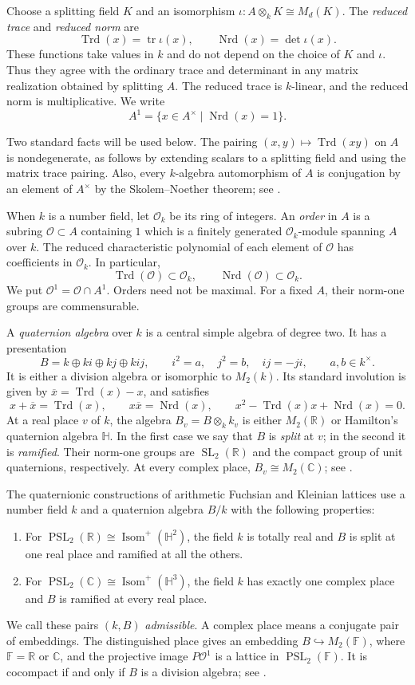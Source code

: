 \documentclass[reqno]{amsart}
\theoremstyle{remark}
\DeclareMathOperator{\tr}{tr}
\DeclareMathOperator{\Trd}{Trd}
\DeclareMathOperator{\Nrd}{Nrd}
\DeclareMathOperator{\SL}{SL}
\DeclareMathOperator{\PSL}{PSL}
\DeclareMathOperator{\Isom}{Isom}
\newcommand{\R}{\mathbb R}
\newcommand{\C}{\mathbb C}
\newcommand{\F}{\mathbb F}
\newcommand{\HH}{\mathbb H}
\newcommand{\OO}{\mathcal O}
\begin{document}
Choose a splitting field $K$ and an isomorphism $\iota:A\otimes_k K\cong M_d(K)$. The \emph{reduced trace} and \emph{reduced norm} are
$$
\Trd(x)=\tr\iota(x),\qquad \Nrd(x)=\det\iota(x).
$$
These functions take values in $k$ and do not depend on the choice of $K$ and $\iota$. Thus they agree with the ordinary trace and determinant in any matrix realization obtained by splitting $A$. The reduced trace is $k$-linear, and the reduced norm is multiplicative. We write
$$
A^1=\{x\in A^\times \mid \Nrd(x)=1\}.
$$

Two standard facts will be used below. The pairing $(x,y)\mapsto\Trd(xy)$ on $A$ is nondegenerate, as follows by extending scalars to a splitting field and using the matrix trace pairing. Also, every $k$-algebra automorphism of $A$ is conjugation by an element of $A^\times$ by the Skolem--Noether theorem; see \cite[\S2.9]{MaclachlanReid}.

When $k$ is a number field, let $\OO_k$ be its ring of integers. An \emph{order} in $A$ is a subring $\OO\subset A$ containing $1$ which is a finitely generated $\OO_k$-module spanning $A$ over $k$. The reduced characteristic polynomial of each element of $\OO$ has coefficients in $\OO_k$. In particular,
$$
\Trd(\OO)\subset\OO_k,\qquad
\Nrd(\OO)\subset\OO_k.
$$
We put $\OO^1=\OO\cap A^1$. Orders need not be maximal. For a fixed $A$, their norm-one groups are commensurable.

A \emph{quaternion algebra} over $k$ is a central simple algebra of degree two. It has a presentation
$$
B=k\oplus ki\oplus kj\oplus kij,
\qquad i^2=a,\quad j^2=b,\quad ij=-ji,
\qquad a,b\in k^\times.
$$
It is either a division algebra or isomorphic to $M_2(k)$. Its standard involution is given by $\overline{x}=\Trd(x)-x$, and satisfies
$$
x+\overline{x}=\Trd(x),\qquad
x\overline{x}=\Nrd(x),\qquad
x^2-\Trd(x)x+\Nrd(x)=0.
$$
At a real place $v$ of $k$, the algebra $B_v=B\otimes_k k_v$ is either $M_2(\R)$ or Hamilton's quaternion algebra $\mathbb H$. In the first case we say that $B$ is \emph{split} at $v$; in the second it is \emph{ramified}. Their norm-one groups are $\SL_2(\R)$ and the compact group of unit quaternions, respectively. At every complex place, $B_v\cong M_2(\C)$; see \cite[\S\S2.1, 2.5]{MaclachlanReid}.

The quaternionic constructions of arithmetic Fuchsian and Kleinian lattices use a number field $k$ and a quaternion algebra $B/k$ with the following properties:
\begin{enumerate}
\item For $\PSL_2(\R) \cong  \Isom^+ (\HH^2)$, the field $k$ is totally real and $B$ is split at one real place and ramified at all the others.
\item For $\PSL_2(\C) \cong  \Isom^+ (\HH^3)$, the field $k$ has exactly one complex place and $B$ is ramified at every real place.
\end{enumerate}
We call these pairs $(k,B)$ \emph{admissible}. A complex place means a conjugate pair of embeddings. The distinguished place gives an embedding $B\hookrightarrow M_2(\F)$, where $\F=\R$ or $\C$, and the projective image $P\OO^1$ is a lattice in $\PSL_2(\F)$. It is cocompact if and only if $B$ is a division algebra; see \cite[\S\S8.1--8.2]{MaclachlanReid}.
\end{document}
